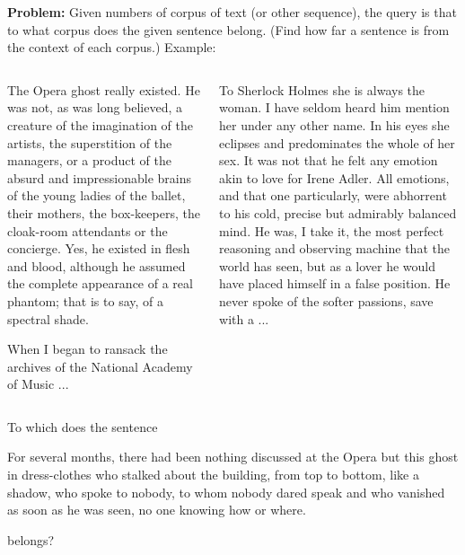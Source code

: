 \documentclass{beamer}
\begin{document}
	\begin{frame}
		\alert{\textbf{Problem: }}Given numbers of corpus of text (or other sequence), the query is that to what corpus does the given sentence belong. (Find how far a sentence is from the context of each corpus.) \pause Example:
		\begin{columns}
			\begin{column}{0.5\textwidth}
					\begin{tcolorbox}[colback=GrL,colframe=CD,title=The Phantom of the Opera]
					\tiny The Opera ghost really existed. He was not, as was long believed,
					a creature of the imagination of the artists, the superstition of
					the managers, or a product of the absurd and impressionable brains
					of the young ladies of the ballet, their mothers, the box-keepers,
					the cloak-room attendants or the concierge. Yes, he existed
					in flesh and blood, although he assumed the complete appearance
					of a real phantom; that is to say, of a spectral shade.
					
					When I began to ransack the archives of the National Academy of
					Music   ...
				\end{tcolorbox}
			\end{column}
			\begin{column}{0.5\textwidth}
				\begin{tcolorbox}[colback=GrL,colframe=CD,title=Sherlock Holmes]
					\tiny To Sherlock Holmes she is always the woman. I have seldom heard him
					mention her under any other name. In his eyes she eclipses and
					predominates the whole of her sex. It was not that he felt any
					emotion akin to love for Irene Adler. All emotions, and that one
					particularly, were abhorrent to his cold, precise but admirably
					balanced mind. He was, I take it, the most perfect reasoning and
					observing machine that the world has seen, but as a lover he would
					have placed himself in a false position. He never spoke of the softer
					passions, save with a
					...
				\end{tcolorbox}
			\end{column}
			
		\end{columns}\pause
		To which does the sentence
		\begin{tcolorbox}[colback=GrL]
			\tiny For several months, there had been nothing discussed
			at the Opera but this ghost in dress-clothes who stalked about
			the building, from top to bottom, like a shadow, who spoke to nobody,
			to whom nobody dared speak and who vanished as soon as he was seen,
			no one knowing how or where.
		\end{tcolorbox}
		 belongs?
	
	\end{frame}
\end{document}
